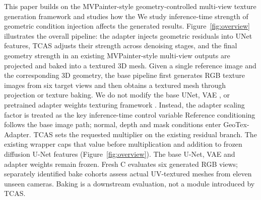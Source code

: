 \documentclass[times,twocolumn,final]{elsarticle}
\providecommand{\DIFadd}[1]{{\protect\color{blue} \sf #1}} %
\providecommand{\DIFdel}[1]{{\protect\color{red} \scriptsize #1}} %
\providecommand{\DIFaddbegin}{} %
\providecommand{\DIFaddend}{} %
\providecommand{\DIFdelbegin}{} %
\providecommand{\DIFdelend}{} %
\begin{document}
\DIFdelbegin \DIFdel{This paper builds on the MVPainter-style geometry-controlled multi-view texture generation framework \cite{shao2025mvpainter}and studies how the }\DIFdelend \DIFaddbegin \DIFadd{We study }\DIFaddend inference-time \DIFdelbegin \DIFdel{strength of geometric condition injection affects the generated results. Figure~\ref{fig:overview} illustrates the overall pipeline: the adapter injects geometric residuals into UNet features, TCAS adjusts their strength across denoising stages, and the final }\DIFdelend \DIFaddbegin \DIFadd{geometry strength in an existing MVPainter-style }\DIFaddend multi-view \DIFdelbegin \DIFdel{outputs are projected and baked into a textured 3D mesh. Given a single reference image and the corresponding 3D geometry, the base pipeline first generates RGB texture images from six target views and then obtains a textured mesh through projection or texture baking. We do not modify the base UNet, VAE , or pretrained adapter weights }\DIFdelend \DIFaddbegin \DIFadd{texturing framework \cite{shao2025mvpainter}}\DIFaddend . \DIFdelbegin \DIFdel{Instead, the adapter scaling factor is treated as the key inference-time control variable}\DIFdelend \DIFaddbegin \DIFadd{Reference conditioning follows the base image path; normal, depth and mask conditions enter GeoTex-Adapter. TCAS sets the requested multiplier on the existing residual branch. The existing wrapper caps that value before multiplication and addition to frozen diffusion U-Net features (Figure~\ref{fig:overview}). The base U-Net, VAE and adapter weights remain frozen. Fresh C evaluates six generated RGB views; separately identified bake cohorts assess actual UV-textured meshes from eleven unseen cameras. Baking is a downstream evaluation, not a module introduced by TCAS}\DIFaddend .
\end{document}
